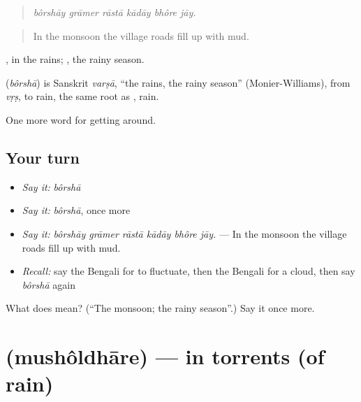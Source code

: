 \begin{quote}
     
\end{quote}

\begin{quote}
\emph{bôrshāy grāmer rāstā kādāy bhôre jāy.}
\end{quote}

\begin{quote}
In the monsoon the village roads fill up with mud.
\end{quote}

, in the rains; , the rainy season.

\begin{cousinweb}
\textbf{} (\emph{bôrshā}) is Sanskrit \emph{varṣā}, \textquotedblleft{}the rains, the rainy season\textquotedblright{} (Monier-Williams), from \emph{vṛṣ}, to rain, the same root as , rain.
\end{cousinweb}

\begin{grammarlens}[title={What you've built}]
One more word for getting around.
\end{grammarlens}

\subsection*{Your turn}
\begin{itemize}
\raggedright
  \item \emph{Say it:} \emph{bôrshā}
  \item \emph{Say it:} \emph{bôrshā}, once more
  \item \emph{Say it:} \emph{bôrshāy grāmer rāstā kādāy bhôre jāy.} — In the monsoon the village roads fill up with mud.
  \item \emph{Recall:} say the Bengali for to fluctuate, then the Bengali for a cloud, then say \emph{bôrshā} again
\end{itemize}

\begin{tcolorbox}[breakable,colback=teal!4,colframe=teal!35!black,title={Before you move on}]
What does  mean? (\textquotedblleft{}The monsoon; the rainy season\textquotedblright{}.) Say it once more.
\end{tcolorbox}
\section[\texorpdfstring{\bn{মুষলধারে} (mushôldhāre)}{মুষলধারে (mushôldhāre)}]{ (mushôldhāre) — in torrents (of rain)}

